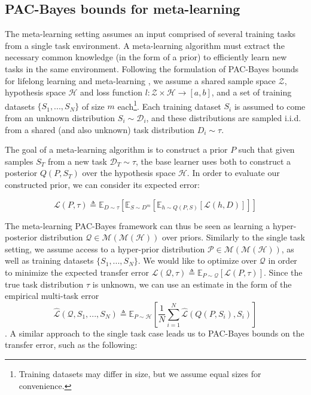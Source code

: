 \documentclass{article}
\theoremstyle{definition}
\newcommand{\Expect}[2]{\mathbb{E}_{#1}\left [#2 \right ]}
\begin{document}
\subsection{PAC-Bayes bounds for meta-learning} \label{sec:meta}

The meta-learning setting assumes an input comprised of several training tasks from a single task environment. A meta-learning algorithm must extract the necessary common knowledge (in the form of a prior) to efficiently learn new tasks in the same environment. Following the formulation of PAC-Bayes bounds for lifelong learning \citep{Pentina2014} and meta-learning \citep{Amit2018}, we assume a shared sample space $\mathcal{Z}$, hypothesis space $\mathcal{H}$ and loss function $l:\mathcal{Z}\times \mathcal{H}\rightarrow [a,b]$, and a set of training datasets $\{S_1,...,S_N\}$ of size $m$ each\footnote{Training datasets may differ in size, but we assume equal sizes for convenience.}. Each training dataset $S_i$ is assumed to come from an unknown distribution $S_i\sim \mathcal{D}_i$, and these distributions are sampled i.i.d. from a shared (and also unknown) task distribution $D_i\sim \tau$.

The goal of a meta-learning algorithm is to construct a prior $P$ such that given samples $S_T$ from a new task $\mathcal{D}_T\sim \tau$, the base learner uses both to construct a posterior $Q(P, S_T)$ over the hypothesis space $\mathcal{H}$. In order to evaluate our constructed prior, we can consider its expected error:

$$\mathcal{L}(P, \tau)\triangleq \Expect{D\sim \tau}{\Expect{S\sim D^m}{\Expect{h\sim Q(P, S)}{\mathcal{L}(h, D)}}}$$

The meta-learning PAC-Bayes framework can thus be seen as learning a hyper-posterior distribution $\mathcal{Q}\in \mathcal{M}(\mathcal{M}(\mathcal{H}))$ over priors. Similarly to the single task setting, we assume access to a hyper-prior distribution $\mathcal{P}\in \mathcal{M}(\mathcal{M}(\mathcal{H}))$, as well as training datasets $\{S_1,...,S_N\}$.
We would like to optimize over $\mathcal{Q}$ in order to minimize the expected transfer error $\mathcal{L}(\mathcal{Q}, \tau) \triangleq \Expect{P\sim \mathcal{Q}}{\mathcal{L}(P, \tau)}$.
Since the true task distribution $\tau$ is unknown, we can use an estimate in the form of the empirical multi-task error $$\hat{\mathcal{L}}(\mathcal{Q}, S_1,...,S_N)\triangleq \Expect{P\sim \mathcal{H}}{\frac{1}{N}\sum_{i=1}^{N}\hat{\mathcal{L}}(Q(P, S_i), S_i)}$$. A similar approach to the single task case leads us to PAC-Bayes bounds on the transfer error, such as the following:
\end{document}
